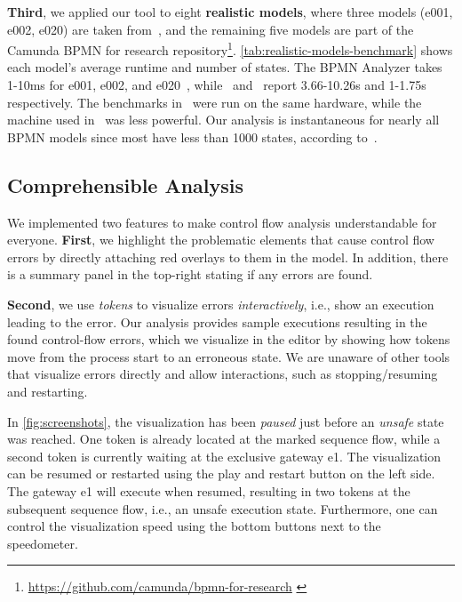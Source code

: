 \documentclass[onecolumn]{ceurart}
\begin{document}
\textbf{Third}, we applied our tool to eight \textbf{realistic models}, where three models (e001, e002, e020) are taken from~\cite{houhouFirstOrderLogicVerification2022}, and the remaining five models are part of the Camunda BPMN for research repository\footnote{\url{https://github.com/camunda/bpmn-for-research} \label{footnote:camundaResearch}}.
\autoref{tab:realistic-models-benchmark} shows each model's average runtime and number of states.
The BPMN Analyzer takes 1-10ms for e001, e002, and e020~\cite{krauterInstantaneousComprehensibleFixable2024}, while~\cite{houhouFirstOrderLogicVerification2022} and~\cite{krauterHigherorderTransformationApproach2024} report 3.66-10.26s and 1-1.75s respectively.
The benchmarks in~\cite{krauterHigherorderTransformationApproach2024} were run on the same hardware, while the machine used in~\cite{houhouFirstOrderLogicVerification2022} was less powerful.
Our analysis is instantaneous for nearly all BPMN models since most have less than 1000 states, according to~\cite{fahlandAnalysisDemandInstantaneous2011}.

\subsection{Comprehensible Analysis}
We implemented two features to make control flow analysis understandable for everyone. 
\textbf{First}, we highlight the problematic elements that cause control flow errors by directly attaching red overlays to them in the model.
In addition, there is a summary panel in the top-right stating if any errors are found.

\textbf{Second}, we use \textit{tokens} to visualize errors \textit{interactively}, i.e., show an execution leading to the error.
Our analysis provides sample executions resulting in the found control-flow errors, which we visualize in the editor by showing how tokens move from the process start to an erroneous state.
We are unaware of other tools that visualize errors directly and allow interactions, such as stopping/resuming and restarting.

In \autoref{fig:screenshots}, the visualization has been \textit{paused} just before an \textit{unsafe} state was reached.
One token is already located at the marked sequence flow, while a second token is currently waiting at the exclusive gateway \textsf{e1}.
The visualization can be resumed or restarted using the play and restart button on the left side.
The gateway \textsf{e1} will execute when resumed, resulting in two tokens at the subsequent sequence flow, i.e., an unsafe execution state.
Furthermore, one can control the visualization speed using the bottom buttons next to the speedometer.
\end{document}
